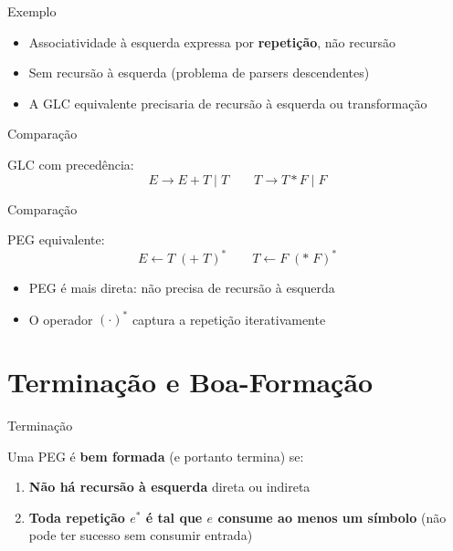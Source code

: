 \begin{frame}{Exemplo}

    \begin{itemize}

        \item
        Associatividade à esquerda expressa por \textbf{repetição}, não
        recursão
        \item
        Sem recursão à esquerda (problema de parsers descendentes)
        \item
        A GLC equivalente precisaria de recursão à esquerda ou transformação
    \end{itemize}
\end{frame}

\begin{frame}{Comparação}

    GLC com precedência: \[E \to E + T \mid T \qquad T \to T * F \mid F\]
\end{frame}

\begin{frame}{Comparação}

    PEG equivalente:
    \[E \leftarrow T\; (\texttt{+}\; T)^* \qquad T \leftarrow F\; (*\; F)^*\]

    \begin{itemize}

        \item
        PEG é mais direta: não precisa de recursão à esquerda
        \item
        O operador \((\cdot)^*\) captura a repetição iterativamente
    \end{itemize}
\end{frame}


\section{Terminação e
Boa-Formação}\label{terminauxe7uxe3o-e-boa-formauxe7uxe3o}

\begin{frame}{Terminação}

    Uma PEG é \textbf{bem formada} (e portanto termina) se:

    \begin{enumerate}

        \item
        \textbf{Não há recursão à esquerda} direta ou indireta
        \item
        \textbf{Toda repetição \(e^*\) é tal que \(e\) consume ao menos um
        símbolo} (não pode ter sucesso sem consumir entrada)
    \end{enumerate}
\end{frame}

